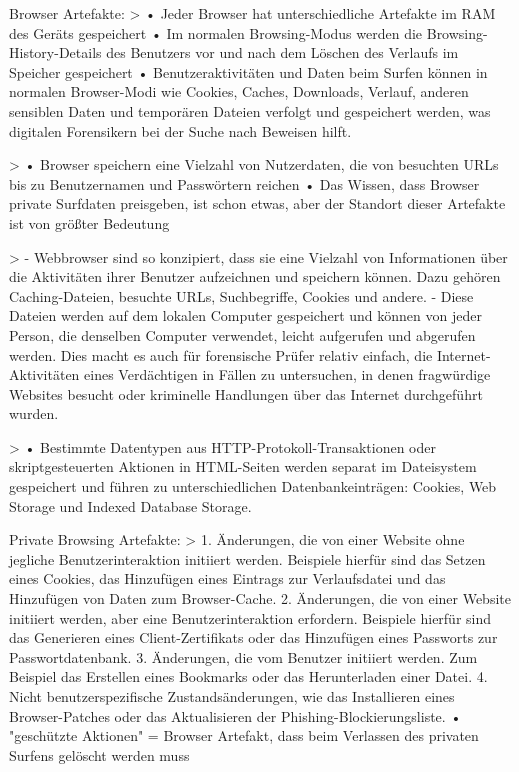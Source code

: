 Browser Artefakte: 
	> \cite{Izzati.2022}
		•	Jeder Browser hat unterschiedliche Artefakte im RAM des Geräts gespeichert
		•	Im normalen Browsing-Modus werden die Browsing-History-Details des Benutzers vor und nach dem Löschen des Verlaufs im Speicher gespeichert
		•	Benutzeraktivitäten und Daten beim Surfen können in normalen Browser-Modi wie Cookies, Caches, Downloads, Verlauf, anderen sensiblen Daten und temporären Dateien verfolgt und gespeichert werden, was digitalen Forensikern bei der Suche nach Beweisen hilft.
	
	> \cite{Mahlous.2020}
		•	Browser speichern eine Vielzahl von Nutzerdaten, die von besuchten URLs bis zu Benutzernamen und Passwörtern reichen
		•	Das Wissen, dass Browser private Surfdaten preisgeben, ist schon etwas, aber der Standort dieser Artefakte ist von größter Bedeutung
	
	> \cite{Said.2011}
		- Webbrowser sind so konzipiert, dass sie eine Vielzahl von Informationen über die Aktivitäten ihrer Benutzer aufzeichnen und speichern können. Dazu gehören Caching-Dateien, besuchte URLs, Suchbegriffe, Cookies und andere.
		- Diese Dateien werden auf dem lokalen Computer gespeichert und können von jeder Person, die denselben Computer verwendet, leicht aufgerufen und abgerufen werden. Dies macht es auch für forensische Prüfer relativ einfach, die Internet-Aktivitäten eines Verdächtigen in Fällen zu untersuchen, in denen fragwürdige Websites besucht oder kriminelle Handlungen über das Internet durchgeführt wurden.
		
	> \cite{Chivers.2014}
		•	Bestimmte Datentypen aus HTTP-Protokoll-Transaktionen oder skriptgesteuerten Aktionen in HTML-Seiten werden separat im Dateisystem gespeichert und führen zu unterschiedlichen Datenbankeinträgen: Cookies, Web Storage und Indexed Database Storage.
		
		

Private Browsing Artefakte: 
	> \cite{Aggarwal.2010}
		1.	Änderungen, die von einer Website ohne jegliche Benutzerinteraktion initiiert werden. Beispiele hierfür sind das Setzen eines Cookies, das Hinzufügen eines Eintrags zur Verlaufsdatei und das Hinzufügen von Daten zum Browser-Cache.
		2.	Änderungen, die von einer Website initiiert werden, aber eine Benutzerinteraktion erfordern. Beispiele hierfür sind das Generieren eines Client-Zertifikats oder das Hinzufügen eines Passworts zur Passwortdatenbank.
		3.	Änderungen, die vom Benutzer initiiert werden. Zum Beispiel das Erstellen eines Bookmarks oder das Herunterladen einer Datei.
		4.	Nicht benutzerspezifische Zustandsänderungen, wie das Installieren eines Browser-Patches oder das Aktualisieren der Phishing-Blockierungsliste.
		•	"geschützte Aktionen" = Browser Artefakt, dass beim Verlassen des privaten Surfens gelöscht werden muss



